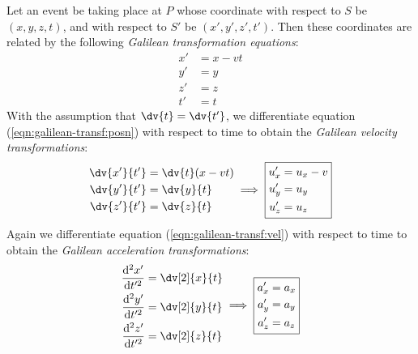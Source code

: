     Let an event be taking place at $P$ whose coordinate with respect to $S$ be $(x,y,z,t)$, and with respect to $S'$ be $(x',y',z',t')$. Then these coordinates are related by the following \emph{Galilean transformation equations}:
    \begin{equation} \label{eqn:galilean-transf:posn}
    	\boxed{
    		\begin{aligned}
    			x'&=x-vt \\
    			y'&=y \\
    			z'&=z \\
    			t'&=t
    		\end{aligned}
    	}
    \end{equation}
    With the assumption that $\dv{t}=\dv{t'}$, we differentiate equation (\ref{eqn:galilean-transf:posn}) with respect to time to obtain the \emph{Galilean velocity transformations}:
    \begin{equation} \label{eqn:galilean-transf:vel}
    	\begin{aligned}
    		\dv{x'}{t'}&=\dv{t}(x-vt) \\
    		\dv{y'}{t'}&=\dv{y}{t} \\
    		\dv{z'}{t'}&=\dv{z}{t}
    	\end{aligned}
    	\implies\boxed{
    			\begin{aligned}
    				u_x'&=u_x-v \\
    				u_y'&=u_y \\
    				u_z'&=u_z
    			\end{aligned}
    	}
    \end{equation}
    Again we differentiate equation (\ref{eqn:galilean-transf:vel}) with respect to time to obtain the \emph{Galilean acceleration transformations}:
    \begin{equation} \label{eqn:galilean-transf:acc}
    	\begin{aligned}
    		\dfrac{\mathrm{d}^2x'}{\mathrm{d}t'^2}&=\dv[2]{x}{t} \\
    		\dfrac{\mathrm{d}^2y'}{\mathrm{d}t'^2}&=\dv[2]{y}{t} \\
    		\dfrac{\mathrm{d}^2z'}{\mathrm{d}t'^2}&=\dv[2]{z}{t}
    	\end{aligned}
    	\implies\boxed{
    		\begin{aligned}
    			a_x'&=a_x \\
    			a_y'&=a_y \\
    			a_z'&=a_z
    		\end{aligned}
    	}
    \end{equation}
    
